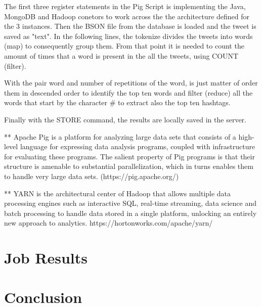 \documentclass{article}
\begin{document}
        The first three register statements in the Pig Script is implementing the Java, MongoDB and Hadoop conetors to work across the the architecture defined for the 3 instances. Then
        the BSON file from the database is loaded and the tweet is saved as "text". In the following lines, the tokenize divides the tweets into words (map) to consequently group them.
        From that point it is needed to count the amount of times that a word is present in the all the tweets, using COUNT (filter).
        
        With the pair word and number of repetitions of the word, is just matter of order them in descended order to identify the top ten words and filter (reduce) all the words that start by the character \# to 
        extract also the top ten hashtags.

        Finally with the STORE command, the results are locally saved in the server.

        ** Apache Pig is a platform for analyzing large data sets that consists of a high-level language for expressing data analysis programs, coupled with infrastructure for evaluating these programs. 
        The salient property of Pig programs is that their structure is amenable to substantial parallelization, which in turns enables them to handle very large data sets. 
        (https://pig.apache.org/)

        ** YARN is the architectural center of Hadoop that allows multiple data processing engines such as interactive SQL, real-time streaming, data science and batch processing to handle data stored 
        in a single platform, unlocking an entirely new approach to analytics.
        https://hortonworks.com/apache/yarn/
        \section{Job Results}
        \section{Conclusion}

      
    
    
    \nocite{*}
\end{document}
